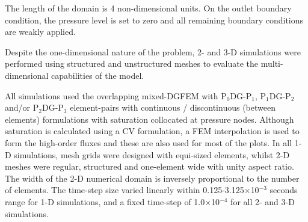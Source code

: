 \documentclass[preprint,authoryear,12pt]{elsarticle}
\newcommand{\PN}[2][error]{P$_{#1}$DG-P$_{#2}$}
\begin{document}
The length of the domain is 4
non-dimensional units. On the outlet boundary condition, the pressure
level is set to zero and all remaining boundary conditions are weakly
applied.

Despite the one-dimensional nature of the problem, 2- and 3-D
simulations were performed using structured and unstructured meshes to
evaluate the multi-dimensional capabilities of the model.

 All simulations used the overlapping mixed-DGFEM with \PN[0]{1},
 \PN[1]{2} and/or \PN[2]{3} element-pairs with continuous /
 discontinuous (between elements) formulations with saturation
 collocated at pressure nodes. Although saturation is calculated using
 a CV formulation, a FEM interpolation is used to form the high-order
 fluxes and these are also used for most of the plots. In all 1-D
 simulations, mesh grids were designed with equi-sized elements,
 whilst 2-D meshes were regular, structured and one-element wide with
 unity aspect ratio. The width of the 2-D numerical domain is
 inversely proportional to the number of elements. The time-step size
 varied linearly within 0.125-3.125$\times$10$^{-3}$ seconds range for
 1-D simulations, and a fixed time-step of 1.0$\times$10$^{-4}$ for
 all 2- and 3-D simulations.

\end{document}
